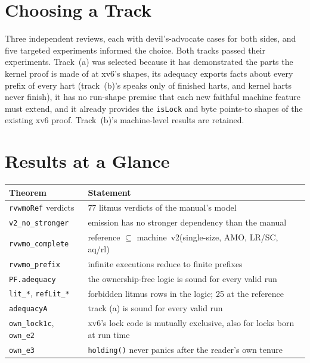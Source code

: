 \documentclass[sigplan,screen,nonacm]{acmart}
\newcommand{\vtwo}{machine~v2\xspace}
\newcommand{\code}[1]{\texttt{#1}}
\begin{document}
\section{Choosing a Track}

Three independent reviews, each with devil's-advocate cases for both sides, and five targeted experiments informed the
choice. Both tracks passed their experiments. Track~(a) was selected because it has demonstrated the parts the kernel
proof is made of at xv6's shapes, its adequacy exports facts about every prefix of every hart (track~(b)'s speaks only
of finished harts, and kernel harts never finish), it has no run-shape premise that each new faithful machine feature
must extend, and it already provides the \code{isLock} and byte points-to shapes of the existing xv6 proof. Track~(b)'s
machine-level results are retained.

\section{Results at a Glance}

\begin{table}[h]
\small
\begin{tabular}{@{}lp{48mm}@{}}
\toprule
Theorem & Statement \\\midrule
\code{rvwmoRef} verdicts & 77 litmus verdicts of the manual's model \\
\code{v2\_no\_stronger} & emission has no stronger dependency than the manual \\
\code{rvwmo\_complete} & reference $\subseteq$ \vtwo (single-size, AMO, LR/SC, aq/rl) \\
\code{rvwmo\_prefix} & infinite executions reduce to finite prefixes \\
\code{PF.adequacy} & the ownership-free logic is sound for every valid run \\
\code{lit\_*}, \code{refLit\_*} & forbidden litmus rows in the logic; 25 at the reference \\
\code{adequacyA} & track (a) is sound for every valid run \\
\code{own\_lock1c}, \code{own\_e2} & xv6's lock code is mutually exclusive, also for locks born at run time \\
\code{own\_e3} & \code{holding()} never panics after the reader's own tenure \\
\bottomrule
\end{tabular}
\end{table}
\end{document}
